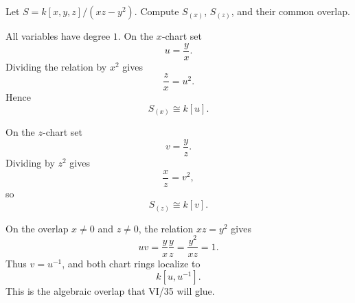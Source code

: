 \begin{problem}\label{prob:vi34-05}
Let \(S=k[x,y,z]/(xz-y^2)\). Compute \(S_{(x)}\), \(S_{(z)}\), and their common overlap.
\end{problem}

\ifdefined\FullProblemDossiers
\begin{solution}
All variables have degree \(1\). On the \(x\)-chart set
\[
u=\frac yx.
\]
Dividing the relation by \(x^2\) gives
\[
\frac zx=u^2.
\]
Hence
\[
S_{(x)}\cong k[u].
\]

On the \(z\)-chart set
\[
v=\frac yz.
\]
Dividing by \(z^2\) gives
\[
\frac xz=v^2,
\]
so
\[
S_{(z)}\cong k[v].
\]

On the overlap \(x\neq0\) and \(z\neq0\), the relation \(xz=y^2\) gives
\[
uv=\frac yx\frac yz=\frac{y^2}{xz}=1.
\]
Thus \(v=u^{-1}\), and both chart rings localize to
\[
\boxed{k[u,u^{-1}]}.
\]
This is the algebraic overlap that VI/35 will glue.
\end{solution}
\fi
